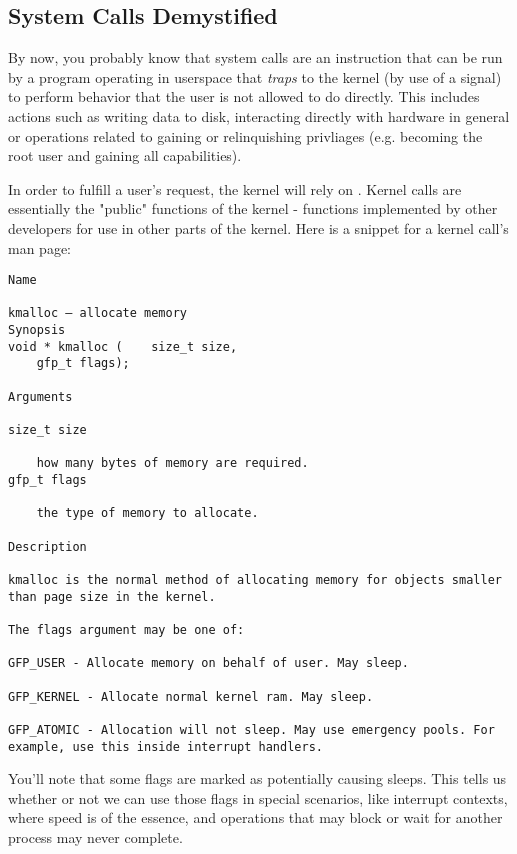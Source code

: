 \subsection{System Calls Demystified}

By now, you probably know that system calls are an instruction that can be run by a program operating in userspace that
\textit{traps} to the kernel (by use of a signal) to perform behavior that the user is not allowed to do directly. This
includes actions such as writing data to disk, interacting directly with hardware in general or operations related to
gaining or relinquishing privliages (e.g.  becoming the root user and gaining all capabilities).

In order to fulfill a user's request, the kernel will rely on . Kernel calls are essentially the
"public" functions of the kernel - functions implemented by other developers for use in other parts of the kernel. Here
is a snippet for a kernel call's man page:

\begin{lstlisting}
Name

kmalloc — allocate memory
Synopsis
void * kmalloc (	size_t size,
 	gfp_t flags);

Arguments

size_t size

    how many bytes of memory are required.
gfp_t flags

    the type of memory to allocate.

Description

kmalloc is the normal method of allocating memory for objects smaller than page size in the kernel.

The flags argument may be one of:

GFP_USER - Allocate memory on behalf of user. May sleep.

GFP_KERNEL - Allocate normal kernel ram. May sleep.

GFP_ATOMIC - Allocation will not sleep. May use emergency pools. For example, use this inside interrupt handlers.
\end{lstlisting}

You'll note that some flags are marked as potentially causing sleeps. This tells us whether or not we can use those
flags in special scenarios, like interrupt contexts, where speed is of the essence, and operations that may block or
wait for another process may never complete.


